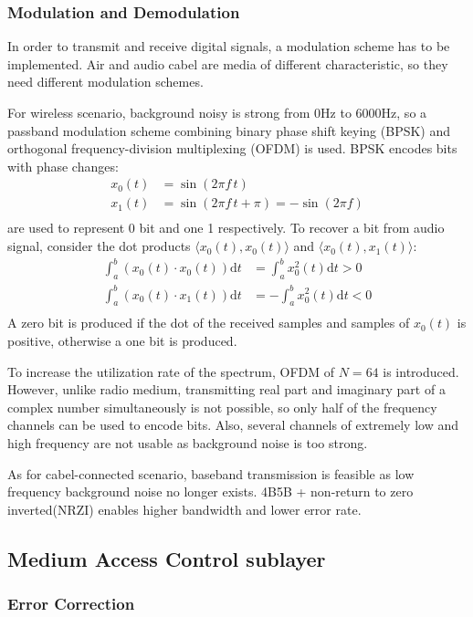 \subsubsection{Modulation and Demodulation}
In order to transmit and receive digital signals, a modulation scheme has to be implemented.
Air and audio cabel are media of different characteristic, so they need different modulation schemes.\par
For wireless scenario, background noisy is strong from 0Hz to 6000Hz,
so a passband modulation scheme
combining binary phase shift keying (BPSK) and orthogonal frequency-division multiplexing (OFDM)
is used.
BPSK encodes bits with phase changes:
\begin{align*}
	x_0(t) & =\sin(2\pi f\, t)                       \\
	x_1(t) & =\sin(2\pi f\, t + \pi) = -\sin(2\pi f) \\
\end{align*}
are used to represent 0 bit and one 1 respectively.
To recover a bit from audio signal, consider the dot products $\langle x_0(t),x_0(t)\rangle$ and $\langle x_0(t),x_1(t) \rangle$:
\begin{align*}
	\int_a^b \left( x_0(t)\cdot x_0(t) \right) \mathrm{d}t & =  \int_a^b x_0^2(t) \mathrm{d}t > 0 \\
	\int_a^b \left( x_0(t)\cdot x_1(t) \right) \mathrm{d}t & = -\int_a^b x_0^2(t) \mathrm{d}t < 0 \\
\end{align*}
A zero bit is produced if the dot of the received samples and samples of $x_0(t)$ is positive, otherwise a one bit is produced.\par
To increase the utilization rate of the spectrum, OFDM of $N=64$ is introduced.
However, unlike radio medium, transmitting real part and imaginary part of a complex number simultaneously is not possible,
so only half of the frequency channels can be used to encode bits.
Also, several channels of extremely low and high frequency are not usable as background noise is too strong.\par
As for cabel-connected scenario, baseband transmission is feasible as low frequency background noise no longer exists.
4B5B + non-return to zero inverted(NRZI) enables higher bandwidth and lower error rate.

\subsection{Medium Access Control sublayer}
\subsubsection{Error Correction}
